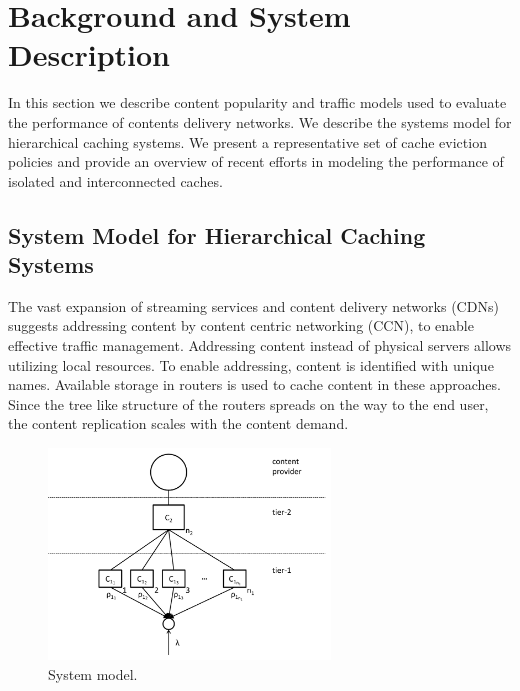 \section{Background and System Description}\label{sec:hierarchical:related_work}

In this section we describe content popularity and traffic models used to evaluate the performance of contents delivery networks.
We describe the systems model for hierarchical caching systems.
We present a representative set of cache eviction policies and provide an overview of recent efforts in modeling the performance of isolated and interconnected caches.

\subsection{System Model for Hierarchical Caching Systems}\label{sec:hierarchical:system_model}

The vast expansion of streaming services and content delivery networks (CDNs) suggests addressing content by content centric networking (CCN), to enable effective traffic management.
Addressing content instead of physical servers allows utilizing local resources.
To enable addressing, content is identified with unique names.
Available storage in routers is used to cache content in these approaches.
Since the tree like structure of the routers spreads on the way to the end user, the content replication scales with the content demand.

\begin{figure}[tb]
\centering
\includegraphics[width=75mm]{hierarchical/analyticbw/figures/hcmodeln1}
\caption{System model.}
\label{fig:hcmodel}
\end{figure}

